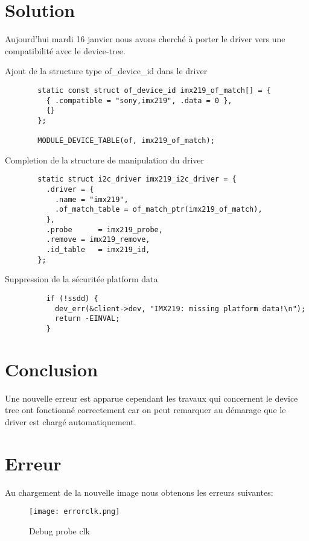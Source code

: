 \section{Solution}
Aujourd'hui mardi 16 janvier nous avons cherché à porter le driver vers
une compatibilité avec le device-tree.
\begin{description}
  \item[Ajout de la structure type of\_device\_id dans le driver]
  \begin{lstlisting}
  static const struct of_device_id imx219_of_match[] = {
    { .compatible = "sony,imx219", .data = 0 },
    {}
  };

  MODULE_DEVICE_TABLE(of, imx219_of_match);
  \end{lstlisting}

  \item[Completion de la structure de manipulation du driver]
  \begin{lstlisting}
  static struct i2c_driver imx219_i2c_driver = {
    .driver = {
      .name = "imx219",
      .of_match_table = of_match_ptr(imx219_of_match),
    },
    .probe		= imx219_probe,
    .remove	= imx219_remove,
    .id_table	= imx219_id,
  };
  \end{lstlisting}

  \item[Suppression de la sécuritée platform data]
  \begin{lstlisting}
    if (!ssdd) {
      dev_err(&client->dev, "IMX219: missing platform data!\n");
      return -EINVAL;
    }
    \end{lstlisting}
\end{description}

\section{Conclusion}
Une nouvelle erreur est apparue cependant les travaux qui concernent le
device tree ont fonctionné correctement car on peut remarquer au démarage
que le driver est chargé automatiquement.

\section{Erreur}
Au chargement de la nouvelle image nous obtenons les erreurs suivantes:

\begin{figure}[th]
  \centering
  \texttt{[image: errorclk.png]}
  \decoRule
  \caption{Debug probe clk}  \label{fig:Debug-probe-clk}
\end{figure}

